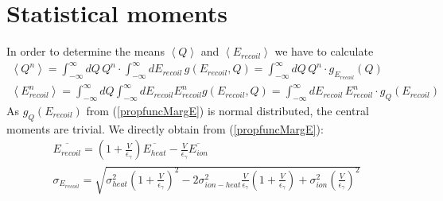 \section{Statistical moments}
In order to determine the means $\left \langle Q \right \rangle$ and $\left \langle E_{recoil} \right \rangle$ we have to calculate
\begin{gather}
\left \langle Q^ n \right \rangle = \int_{-\infty}^{\infty} dQ \, Q^n \cdot  \int_{-\infty}^{\infty} dE_{recoil} \, g(E_{recoil},Q) = \int_{-\infty}^{\infty} dQ \, Q^n \cdot g_{E_{recoil}}(Q) \\
\left \langle E_{recoil}^n \right \rangle = \int_{-\infty}^{\infty} dQ \int_{-\infty}^{\infty} dE_{recoil} E_{recoil}^n g(E_{recoil},Q) = \int_{-\infty}^{\infty} dE_{recoil} \, E_{recoil}^n \cdot g_Q(E_{recoil})
\end{gather}
As $g_Q(E_{recoil})$ from (\ref{propfuncMargE}) is normal distributed, the central moments are trivial. We directly obtain from (\ref{propfuncMargE}):
\begin{gather}
\overline{E_{recoil}} = \left( 1 + \frac{V}{\epsilon_\gamma} \right) \overline{E_{heat}} - \frac{V}{\epsilon_\gamma} \overline{E_{ion}} \\
\sigma_{E_{recoil}} = \sqrt{ \sigma_{heat}^2 \left(1 + \frac{V}{\epsilon_\gamma} \right)^2 - 2 \sigma_{ion-heat}^2 \frac{V}{\epsilon_\gamma} \left( 1 + \frac{V}{\epsilon_\gamma} \right) + \sigma_{ion}^2 \left( \frac{V}{\epsilon_\gamma} \right)^2}
\end{gather}

